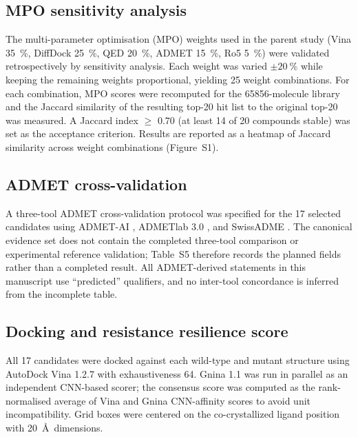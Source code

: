 \documentclass[11pt,a4paper]{article}
\begin{document}
\subsection{MPO sensitivity analysis}

The multi-parameter optimisation (MPO) weights used in the parent study (Vina \qty{35}{\percent}, DiffDock \qty{25}{\percent}, QED \qty{20}{\percent}, ADMET \qty{15}{\percent}, Ro5 \qty{5}{\percent}) were validated retrospectively by sensitivity analysis. Each weight was varied $\pm\qty{20}{\percent}$ while keeping the remaining weights proportional, yielding 25 weight combinations. For each combination, MPO scores were recomputed for the \num{65856}-molecule library and the Jaccard similarity of the resulting top-20 hit list to the original top-20 was measured. A Jaccard index $\geq$ 0.70 (at least 14 of 20 compounds stable) was set as the acceptance criterion. Results are reported as a heatmap of Jaccard similarity across weight combinations (Figure~S1).

\subsection{ADMET cross-validation}

A three-tool ADMET cross-validation protocol was specified for the 17 selected candidates using ADMET-AI \citep{admetai_2023}, ADMETlab 3.0 \citep{admetlab3_2024}, and SwissADME \citep{swissadme_2017}. The canonical evidence set does not contain the completed three-tool comparison or experimental reference validation; Table~S5 therefore records the planned fields rather than a completed result. All ADMET-derived statements in this manuscript use ``predicted'' qualifiers, and no inter-tool concordance is inferred from the incomplete table.

\subsection{Docking and resistance resilience score}\label{sec:rrs_formula}

All 17 candidates were docked against each wild-type and mutant structure using AutoDock Vina 1.2.7 with exhaustiveness 64. Gnina 1.1 was run in parallel as an independent CNN-based scorer; the consensus score was computed as the rank-normalised average of Vina and Gnina CNN-affinity scores to avoid unit incompatibility. Grid boxes were centered on the co-crystallized ligand position with \SI{20}{\angstrom}\ dimensions.
\end{document}

